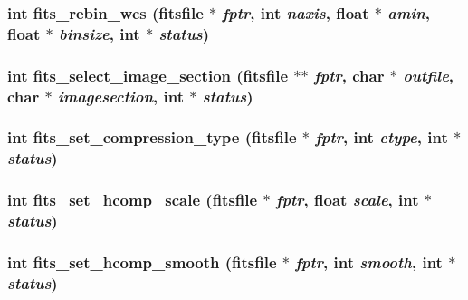 \subsubsection{\setlength{\rightskip}{0pt plus 5cm}int fits\_\-rebin\_\-wcs (\bf{fitsfile} $\ast$ {\em fptr}, int {\em naxis}, float $\ast$ {\em amin}, float $\ast$ {\em binsize}, int $\ast$ {\em status})}\label{fitsio_8h_5f8894060e02e765fe5b903552a4ed2b}


\subsubsection{\setlength{\rightskip}{0pt plus 5cm}int fits\_\-select\_\-image\_\-section (\bf{fitsfile} $\ast$$\ast$ {\em fptr}, char $\ast$ {\em outfile}, char $\ast$ {\em imagesection}, int $\ast$ {\em status})}\label{fitsio_8h_dc5debec3a5366eaf21b7141bcb2e387}


\subsubsection{\setlength{\rightskip}{0pt plus 5cm}int fits\_\-set\_\-compression\_\-type (\bf{fitsfile} $\ast$ {\em fptr}, int {\em ctype}, int $\ast$ {\em status})}\label{fitsio_8h_b652dea131c6bb15a00caa955610762d}


\subsubsection{\setlength{\rightskip}{0pt plus 5cm}int fits\_\-set\_\-hcomp\_\-scale (\bf{fitsfile} $\ast$ {\em fptr}, float {\em scale}, int $\ast$ {\em status})}\label{fitsio_8h_2477ffb276bd916b22c8927c36e69c32}


\subsubsection{\setlength{\rightskip}{0pt plus 5cm}int fits\_\-set\_\-hcomp\_\-smooth (\bf{fitsfile} $\ast$ {\em fptr}, int {\em smooth}, int $\ast$ {\em status})}\label{fitsio_8h_af882f0c95449ce03116823582fe9a34}


